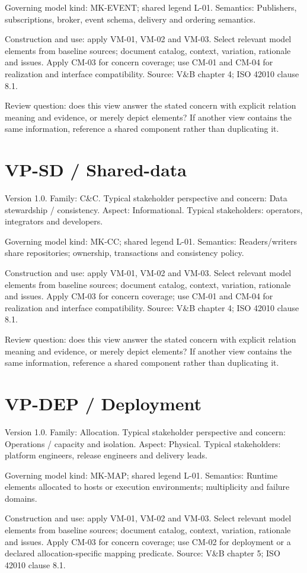 \documentclass[11pt,letterpaper]{article}
\newcommand{\docsection}[1]{\Needspace{5\baselineskip}\section{#1}}
\begin{document}
Governing model kind: MK-EVENT; shared legend L-01. Semantics: Publishers, subscriptions, broker, event schema, delivery and ordering semantics.

Construction and use: apply VM-01, VM-02 and VM-03. Select relevant model elements from baseline sources; document catalog, context, variation, rationale and issues. Apply CM-03 for concern coverage; use CM-01 and CM-04 for realization and interface compatibility. Source: V\&B chapter 4; ISO 42010 clause 8.1.

Review question: does this view answer the stated concern with explicit relation meaning and evidence, or merely depict elements? If another view contains the same information, reference a shared component rather than duplicating it.

\docsection{VP-SD / Shared-data}
Version 1.0. Family: C\&C. Typical stakeholder perspective and concern: Data stewardship / consistency. Aspect: Informational. Typical stakeholders: operators, integrators and developers.

Governing model kind: MK-CC; shared legend L-01. Semantics: Readers/writers share repositories; ownership, transactions and consistency policy.

Construction and use: apply VM-01, VM-02 and VM-03. Select relevant model elements from baseline sources; document catalog, context, variation, rationale and issues. Apply CM-03 for concern coverage; use CM-01 and CM-04 for realization and interface compatibility. Source: V\&B chapter 4; ISO 42010 clause 8.1.

Review question: does this view answer the stated concern with explicit relation meaning and evidence, or merely depict elements? If another view contains the same information, reference a shared component rather than duplicating it.

\docsection{VP-DEP / Deployment}
Version 1.0. Family: Allocation. Typical stakeholder perspective and concern: Operations / capacity and isolation. Aspect: Physical. Typical stakeholders: platform engineers, release engineers and delivery leads.

Governing model kind: MK-MAP; shared legend L-01. Semantics: Runtime elements allocated to hosts or execution environments; multiplicity and failure domains.

Construction and use: apply VM-01, VM-02 and VM-03. Select relevant model elements from baseline sources; document catalog, context, variation, rationale and issues. Apply CM-03 for concern coverage; use CM-02 for deployment or a declared allocation-specific mapping predicate. Source: V\&B chapter 5; ISO 42010 clause 8.1.
\end{document}
